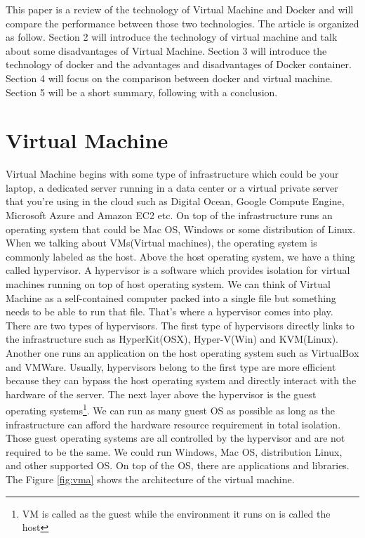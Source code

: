 \documentclass{sig-alternate}
\begin{document}
This paper is a review of the technology of Virtual Machine and Docker and will compare the performance between those two technologies. The article is organized as follow. Section 2 will introduce the technology of virtual machine and talk about some disadvantages of Virtual Machine. Section 3 will introduce the technology of docker and the advantages and disadvantages of Docker container. Section 4 will focus on the comparison between docker and virtual machine. Section 5 will be a short summary, following with a conclusion. 

\section{Virtual Machine}
Virtual Machine begins with some type of infrastructure which could be your laptop, a dedicated server running in a data center or a virtual private server that you're using in the cloud such as Digital Ocean, Google Compute Engine, Microsoft Azure and Amazon EC2 etc. On top of the infrastructure runs an operating system that could be Mac OS, Windows or some distribution of Linux. When we talking about VMs(Virtual machines), the operating system is commonly labeled as the host. Above the host operating system, we have a thing called hypervisor. A hypervisor is a software which provides isolation for virtual machines running on top of host operating system. We can think of Virtual Machine as a self-contained computer packed into a single file but something needs to be able to run that file. That's where a hypervisor comes into play. There are two types of hypervisors. The first type of hypervisors directly links to the infrastructure such as HyperKit(OSX), Hyper-V(Win) and KVM(Linux). Another one runs an application on the host operating system such as VirtualBox and VMWare. Usually, hypervisors belong to the first type are more efficient because they can bypass the host operating system and directly interact with the hardware of the server. The next layer above the hypervisor is the guest operating systems\footnote{VM is called as the guest while the environment it runs on is called the host}. We can run as many guest OS as possible as long as the infrastructure can afford the hardware resource requirement in total isolation. Those guest operating systems are all controlled by the hypervisor and are not required to be the same. We could run Windows, Mac OS, distribution Linux, and other supported OS.  On top of the OS, there are applications and libraries. The Figure \ref{fig:vma} shows the architecture of the virtual machine. 
\end{document}
